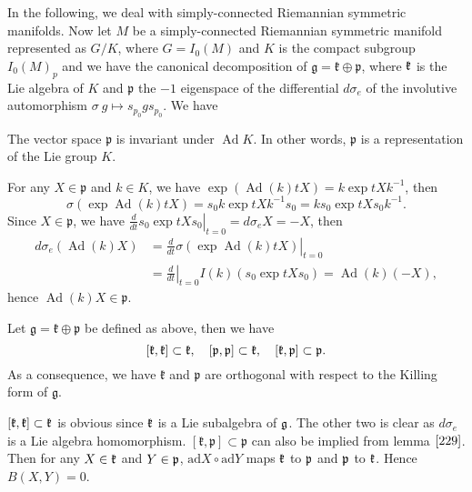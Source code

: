 	In the following, we deal with simply-connected Riemannian
	symmetric manifolds. Now let $M$ be a simply-connected
	Riemannian symmetric manifold represented as $G / K$, where
	$G=I_{0}(M)$ and $K$ is the compact subgroup $I_0(M)_p$ and
	we have the canonical decomposition of $\mathfrak{g} =
	\mathfrak{k}\oplus\mathfrak{p}$,
	where ${\mathfrak k}$ is the Lie algebra of $K$ and $\mathfrak{p}$ 
	the $-1$ eigenspace of the differential
	$d \sigma_{e}$ of the involutive automorphism $\sigma
	\: g \mapsto s_{p_{0}} g s_{p_{0}} .$ We have

\begin{lemma}\label{229}
		The vector space $\mathfrak{p}$ is invariant under
		$\operatorname{Ad} K$. In other words, $\mathfrak{p}$ is
		a representation of the Lie group $K$.
\end{lemma}
\bproof
For any $X \in \mathfrak{p}$ and $k \in K$, we have $\exp
(\operatorname{Ad}(k) t X) = k \exp t X k^{-1}$, then
\[
\sigma(\exp \operatorname{Ad}(k) t X) = s_{0} k \exp t X k^{-1}
s_{0} = k s_{0} \exp t X s_{0} k^{-1}.
\]
Since $X \in \mathfrak{p}$, we have $\left.\frac{d}{d t} s_{0}
\exp t X s_{0}\right|_{t=0} = d\sigma_{e}X = -X$, then
\[
\begin{aligned}
	d \sigma_{e}(\operatorname{Ad}(k) X) & = \left.\frac{d}{d t}
	\sigma(\exp \operatorname{Ad}(k) t X)\right|_{t=0} \\
	& = \left.\frac{d}{d t}\right|_{t=0} I(k)\left(s_{0} \exp t
	Xs_{0}\right) = \operatorname{Ad}(k)(-X),
\end{aligned}
\]
hence $\operatorname{Ad}(k) X \in \mathfrak{p}$.
\eproof

\begin{proposition}
	Let $\mathfrak{g} = \mathfrak{k}\oplus\mathfrak{p}$ be
	defined as above, then we have
	\[
	[\mathfrak{k}, {\mathfrak k}] \subset \mathfrak{k},
	\quad[\mathfrak{p}, \mathfrak{p}] \subset \mathfrak{k},
	\quad[\mathfrak{k}, \mathfrak{p}] \subset \mathfrak{p}.
	\]
	As a consequence, we have $\mathfrak{k}$ and $\mathfrak{p}$
	are orthogonal with respect to the Killing
	form of $\mathfrak{g}$. 
\end{proposition}
\bproof
$[\mathfrak{k}, {\mathfrak k}] \subset \mathfrak{k}$ is obvious since
${\mathfrak k}$ is a Lie subalgebra of ${\mathfrak g}$. The other two is clear as
$d\sigma_{e}$ is a Lie algebra homomorphism. $[\mathfrak{k},
\mathfrak{p}] \subset \mathfrak{p}$ can also be implied from
lemma $\ref{229}$.  Then for any $X\in {\mathfrak k}$ and $Y\in {\mathfrak p}$,
$\mathrm{ad}X \circ \mathrm{ad}Y$ maps ${\mathfrak k}$ to ${\mathfrak p}$ and
${\mathfrak p}$ to ${\mathfrak k}$. Hence $B(X, Y) = 0$.
\eproof

